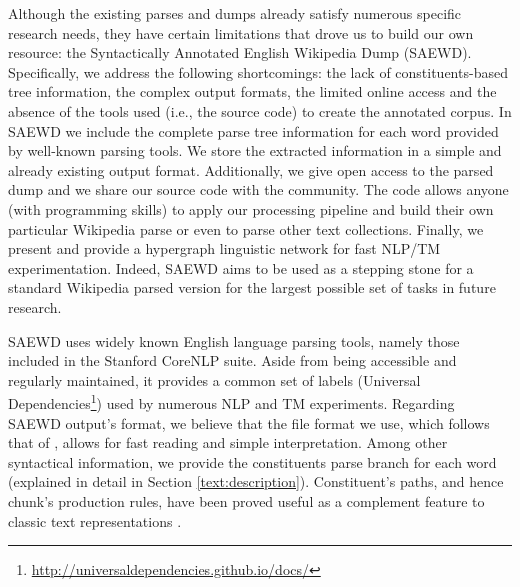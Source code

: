   
Although the existing parses and dumps already satisfy numerous specific research needs, they have certain limitations that drove us to build our own resource: the Syntactically Annotated English Wikipedia  Dump (SAEWD). Specifically, we address the following shortcomings: the lack of constituents-based tree information, the complex output formats, the limited online access and the absence of the tools used (i.e., the source code) to create the annotated corpus. In SAEWD we include the complete parse tree information for each word provided by well-known parsing tools. We store the extracted information in a simple and already existing output format. Additionally, we give open access to the parsed dump and we share our source code with the community. The code allows anyone (with programming skills) to  apply our processing pipeline and build their own particular Wikipedia parse or even to parse other text collections. Finally, we present and provide a hypergraph linguistic network for fast NLP/TM experimentation. Indeed, SAEWD aims to be used as a stepping stone for a standard Wikipedia parsed version for the largest possible set of tasks in future research. 

SAEWD uses widely known English language parsing tools, namely those included in the Stanford CoreNLP suite.  Aside from being accessible and regularly maintained, it provides a common set of labels (Universal Dependencies\footnote{\url{http://universaldependencies.github.io/docs/}}) used by numerous NLP and TM experiments. Regarding SAEWD output's format, we believe that the file format we use, which follows  that of \cite{ATSERIAS08}, allows for fast reading and simple interpretation. Among other syntactical information, we provide the constituents parse branch for each word (explained in detail in Section \ref{text:description}). 
Constituent's paths, and hence chunk's production rules, have been proved useful as a complement feature to classic text representations \cite{sagae2009,Bergsma2012,Massung2013}. 

